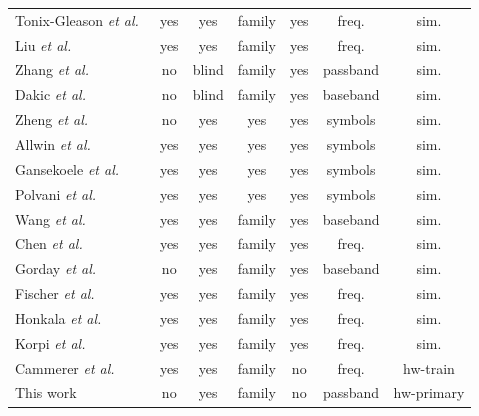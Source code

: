 \documentclass{ieeeaccess}
\begin{document}
\begin{table}[!t]
\begin{tabular}{lcccccc}
Tonix-Gleason \textit{et al.}~\cite{Tonix2025NNAided} & yes & yes & family & yes & freq. & sim. \\
Liu \textit{et al.}~\cite{liu2026Universal} & yes & yes & family & yes & freq. & sim. \\
Zhang \textit{et al.}~\cite{Zhang2018Enhanced} & no & blind & family & yes & passband & sim. \\
Dakic \textit{et al.}~\cite{dakic2021LoRa} & no & blind & family & yes & baseband & sim. \\
Zheng \textit{et al.}~\cite{Zheng2022DemodNet} & no & yes & yes & yes & symbols & sim. \\
Allwin \textit{et al.}~\cite{alwin2024LLRSymNet} & yes & yes & yes & yes & symbols & sim. \\
Gansekoele \textit{et al.}~\cite{ganse2024MLApprochDemapping} & yes & yes & yes & yes & symbols & sim. \\
Polvani \textit{et al.}~\cite{polvani2021MIMO} & yes & yes & yes & yes & symbols & sim. \\
Wang \textit{et al.}~\cite{wang2024optimalSequence} & yes & yes & family & yes & baseband & sim. \\
Chen \textit{et al.}~\cite{chen2024robustSymboldetection} & yes & yes & family & yes & freq. & sim. \\
Gorday \textit{et al.}~\cite{gorday2020complexNN} & no & yes & family & yes & baseband & sim. \\
Fischer \textit{et al.}~\cite{fischer2022OFDM} & yes & yes & family & yes & freq. & sim. \\
Honkala \textit{et al.}~\cite{honkala2021deeprxfullyconvolutionaldeep} & yes & yes & family & yes & freq. & sim. \\
Korpi \textit{et al.}~\cite{korpi2021UplinkCNN} & yes & yes & family & yes & freq. & sim. \\
Cammerer \textit{et al.}~\cite{cammerer2020trainableCS} & yes & yes & family & no & freq. & hw-train \\
\addlinespace
This work & no & yes & family & no & passband & hw-primary \\
\bottomrule
\end{tabular}
\end{table}
\end{document}
